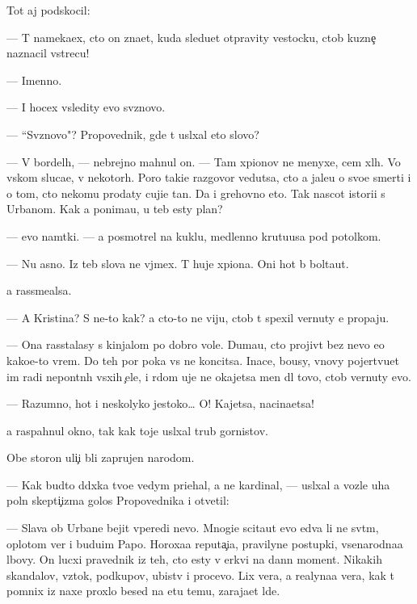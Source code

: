 \documentclass[10pt]{book}
\begin{document}
Tot aj podskocil:

— T{\yi} nameka{\y}ex, cto on zna{\y}et, kuda sledu{\y}et otpravity vestocku, ctob{\yi} kuzne{\c} naznacil vstrecu!

— Imenno.

— I hocex v{\yi}sledity {\y}evo sv{\ia}znovo.

— ``Sv{\ia}znovo"? Pro\-po\-ved\-nik, gde t{\yi} usl{\yi}xal eto slovo?

— V bordel{\ia}h, — nebrejno mahnul on. — Tam xpionov ne menyxe, cem xl{\io}h. Vo vs{\ia}kom sluca{\y}e, v nekotor{\yi}h. Poro{\y} taki{\y}e razgovor{\yi} vedutsa, cto {\y}a jale{\y}u o svo{\y}e{\y} smerti i o tom, cto nekomu prodaty cuji{\y}e ta{\y}n{\yi}. Da i grehovno eto. Tak nascot istori{\y}i s Urbanom. Kak {\y}a ponima{\y}u, u teb{\ia} {\y}esty plan?

— {\Y}evo nam{\e}tki. — {\Y}a posmotrel na kuklu, medlenno krut{\ia}{\x}u{\y}usa pod potolkom.

— Nu {\y}asno. Iz teb{\ia} slova ne v{\yi}jmex. T{\yi} huje xpiona. Oni hot{\ia} b{\yi} bolta{\y}ut.

{\Y}a rassme{\y}alsa.

— A Kristina? S ne{\y}-to kak? {\Y}a cto-to ne viju, ctob{\yi} t{\yi} spexil vernuty {\y}e{\y} propaju.

— Ona rasstalasy s kinjalom po dobro{\y} vole. Duma{\y}u, cto projiv{\e}t bez nevo {\y}e{\x}o kako{\y}e-to vrem{\ia}. Do teh por poka vs{\e} ne koncitsa. Inace, bo{\y}usy, vnovy pojertvu{\y}et im radi nepon{\ia}tn{\yi}h v{\yi}sxih {\c}ele{\y}, i r{\ia}dom uje ne okajetsa men{\ia} dl{\ia} tovo, ctob{\yi} vernuty {\y}evo.

— Razumno, hot{\ia} i neskolyko jestoko… O! Kajetsa, nacina{\y}etsa!

{\Y}a raspahnul okno, tak kak toje usl{\yi}xal trub{\yi} gornistov.

Obe storon{\yi} uli{\c}i b{\yi}li zaprujen{\yi} narodom.

— Kak budto d{\ia}d{\io}xka tvo{\y}e{\y} vedym{\yi} pri{\y}ehal, a ne kardinal, — usl{\yi}xal {\y}a voz\-le uha poln{\yi}{\y} skepti{\c}izma golos Pro\-po\-ved\-nika i otvetil:

— Slava ob Urbane bejit vperedi nevo. Mnogi{\y}e scita{\y}ut {\y}evo {\y}edva li ne sv{\ia}\-t{\yi}m, oplotom ver{\yi} i budu{\x}im Papo{\y}. Horoxa{\y}a reputa{\c}i{\y}a, pravilyn{\yi}{\y}e postupki, vse\-narod\-na\-{\y}a l{\io}bovy. On lucxi{\y} pravednik iz teh, cto {\y}esty v {\C}erkvi na dann{\yi}{\y} moment. Nikakih skandalov, vz{\ia}tok, podkupov, ubi{\y}stv i procevo. Lix vera, a realyna{\y}a vera, kak t{\yi} pomnix iz naxe{\y} proxlo{\y} besed{\yi} na etu temu, zaraja{\y}et l{\io}de{\y}.
\end{document}
